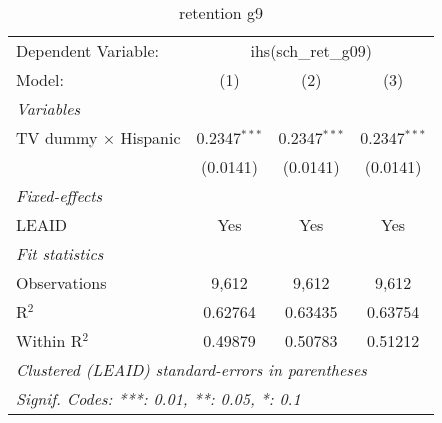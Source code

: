 \begin{table}[htbp]
\centering
\caption{retention g9}
\begin{tabular}{lccc}
\tabularnewline\midrule\midrule
Dependent Variable:&\multicolumn{3}{c}{ihs(sch\_ret\_g09)}\\
Model:&(1) & (2) & (3)\\
\midrule \emph{Variables}&   &   &  \\
TV dummy $\times$ Hispanic & 0.2347$^{***}$ & 0.2347$^{***}$ & 0.2347$^{***}$\\
  &(0.0141) & (0.0141) & (0.0141)\\
\midrule \emph{Fixed-effects}&   &   &  \\
LEAID & Yes & Yes & Yes\\
\midrule \emph{Fit statistics}&  & & \\
Observations & 9,612&9,612&9,612\\
R$^2$ & 0.62764&0.63435&0.63754\\
Within R$^2$ & 0.49879&0.50783&0.51212\\
\midrule\midrule\multicolumn{4}{l}{\emph{Clustered (LEAID) standard-errors in parentheses}}\\
\multicolumn{4}{l}{\emph{Signif. Codes: ***: 0.01, **: 0.05, *: 0.1}}\\
\end{tabular}
\end{table}

